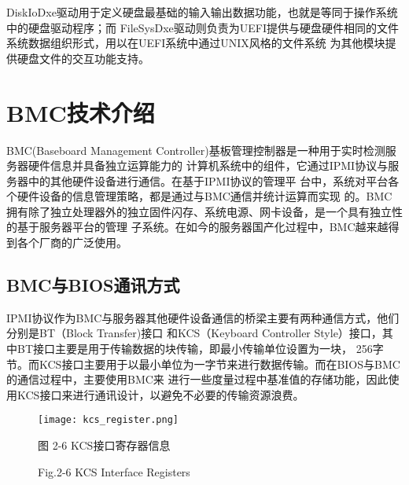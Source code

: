 
DiskIoDxe驱动用于定义硬盘最基础的输入输出数据功能，也就是等同于操作系统中的硬盘驱动程序；而
FileSysDxe驱动则负责为UEFI提供与硬盘硬件相同的文件系统数据组织形式，用以在UEFI系统中通过UNIX风格的文件系统
为其他模块提供硬盘文件的交互功能支持。
%
%
\section{BMC技术介绍}
BMC(Baseboard Management Controller)基板管理控制器是一种用于实时检测服务器硬件信息并具备独立运算能力的
计算机系统中的组件，它通过IPMI协议与服务器中的其他硬件设备进行通信。在基于IPMI协议的管理平
台中，系统对平台各个硬件设备的信息管理策略，都是通过与BMC通信并统计运算而实现
的\cite{addition5,addition6}。BMC拥有除了独立处理器外的独立固件闪存、系统电源、网卡设备，是一个具有独立性的基于服务器平台的管理
子系统。在如今的服务器国产化过程中，BMC越来越得到各个厂商的广泛使用。

\subsection{BMC与BIOS通讯方式}
IPMI协议作为BMC与服务器其他硬件设备通信的桥梁主要有两种通信方式，他们分别是BT（Block Transfer)接口
和KCS（Keyboard Controller Style）接口，其中BT接口主要是用于传输数据的块传输，即最小传输单位设置为一块，
256字节。而KCS接口主要用于以最小单位为一字节来进行数据传输。而在BIOS与BMC的通信过程中，主要使用BMC来
进行一些度量过程中基准值的存储功能，因此使用KCS接口来进行通讯设计，以避免不必要的传输资源浪费。

\begin{figure}[htb]
    \vspace{0cm}   
    \setlength{\abovecaptionskip}{0.3cm}  
	\centering
    \texttt{[image: kcs\_register.png]}
    \caption*{图 2-6 KCS接口寄存器信息}
    \setlength{\belowcaptionskip}{-0.7cm}
    \caption*{Fig.2-6 KCS Interface Registers}
\end{figure}

